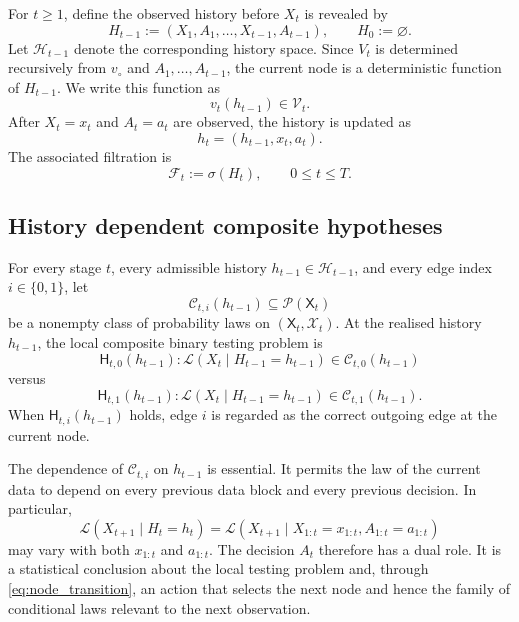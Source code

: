 \documentclass[11pt]{article}
\newcommand{\cP}{\mathcal{P}}
\newcommand{\cC}{\mathcal{C}}
\newcommand{\cF}{\mathcal{F}}
\newcommand{\cH}{\mathcal{H}}
\newcommand{\cV}{\mathcal{V}}
\begin{document}
For $t\ge 1$, define the observed history before $X_t$ is revealed by
\begin{equation}
H_{t-1}:=(X_1,A_1,\ldots,X_{t-1},A_{t-1}),
\qquad H_0:=\varnothing.
\label{eq:history}
\end{equation}
Let $\cH_{t-1}$ denote the corresponding history space. Since $V_t$ is determined recursively from $v_{\circ}$ and $A_1,\ldots,A_{t-1}$, the current node is a deterministic function of $H_{t-1}$. We write this function as
\[
v_t(h_{t-1})\in\cV_t.
\]
After $X_t=x_t$ and $A_t=a_t$ are observed, the history is updated as
\[
h_t=(h_{t-1},x_t,a_t).
\]
The associated filtration is
\[
\cF_t:=\sigma(H_t),\qquad 0\le t\le T.
\]

\subsection{History dependent composite hypotheses}

For every stage $t$, every admissible history $h_{t-1}\in\cH_{t-1}$, and every edge index $i\in\{0,1\}$, let
\[
\cC_{t,i}(h_{t-1})\subseteq \cP(\mathsf{X}_t)
\]
be a nonempty class of probability laws on $(\mathsf{X}_t,\mathcal{X}_t)$. At the realised history $h_{t-1}$, the local composite binary testing problem is
\begin{equation}
\mathsf{H}_{t,0}(h_{t-1}):
\mathcal{L}(X_t\mid H_{t-1}=h_{t-1})\in\cC_{t,0}(h_{t-1})
\end{equation}
versus
\begin{equation}
\mathsf{H}_{t,1}(h_{t-1}):
\mathcal{L}(X_t\mid H_{t-1}=h_{t-1})\in\cC_{t,1}(h_{t-1}).
\end{equation}
When $\mathsf{H}_{t,i}(h_{t-1})$ holds, edge $i$ is regarded as the correct outgoing edge at the current node.

The dependence of $\cC_{t,i}$ on $h_{t-1}$ is essential. It permits the law of the current data to depend on every previous data block and every previous decision. In particular,
\begin{equation}
\mathcal{L}(X_{t+1}\mid H_t=h_t)
=
\mathcal{L}(X_{t+1}\mid X_{1:t}=x_{1:t},A_{1:t}=a_{1:t})
\label{eq:history_dependent_law}
\end{equation}
may vary with both $x_{1:t}$ and $a_{1:t}$. The decision $A_t$ therefore has a dual role. It is a statistical conclusion about the local testing problem and, through \eqref{eq:node_transition}, an action that selects the next node and hence the family of conditional laws relevant to the next observation.
\end{document}
